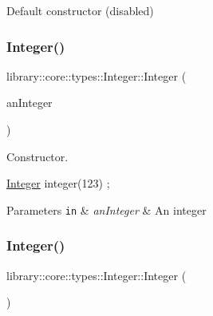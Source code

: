 Default constructor (disabled) 

\mbox{\label{classlibrary_1_1core_1_1types_1_1_integer_ac282b8e24c1d1a43e578c5be3c70ea27}} 
\subsubsection{\texorpdfstring{Integer()}{Integer()}\hspace{0.1cm}{\footnotesize\ttfamily [2/4]}}
{\footnotesize\ttfamily library\+::core\+::types\+::\+Integer\+::\+Integer (\begin{DoxyParamCaption}\item[{\hyperlink{classlibrary_1_1core_1_1types_1_1_integer_a623afb1580f870fd8a1997b1c12c917d}{Integer\+::\+Value\+Type}}]{an\+Integer }\end{DoxyParamCaption})}



Constructor. 


\begin{DoxyCode}
\hyperlink{classlibrary_1_1core_1_1types_1_1_integer_a6483b1c4e13e5ed6af5e7a58347efead}{Integer} integer(123) ;
\end{DoxyCode}



\begin{DoxyParams}[1]{Parameters}
\mbox{\tt in}  & {\em an\+Integer} & An integer \\
\hline
\end{DoxyParams}
\mbox{\label{classlibrary_1_1core_1_1types_1_1_integer_af3bcebe374c4b7b4329ed0a7fae04abd}} 
\subsubsection{\texorpdfstring{Integer()}{Integer()}\hspace{0.1cm}{\footnotesize\ttfamily [3/4]}}
{\footnotesize\ttfamily library\+::core\+::types\+::\+Integer\+::\+Integer (\begin{DoxyParamCaption}\item[{float}]{ }\end{DoxyParamCaption})\hspace{0.3cm}{\ttfamily [delete]}}



